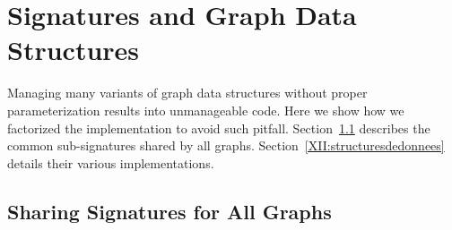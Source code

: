 
\section{Signatures and Graph Data Structures}\label{XII:implementation}

Managing many variants of graph data structures without proper
parameterization results into unmanageable code.
%
Here we show how we factorized the \ocamlgraph implementation to avoid
such pitfall.  Section~\ref{XII:interface} describes the common
sub-signatures shared by all graphs. Section~\ref{XII:structuresdedonnees}
details their various implementations.


\subsection{Sharing Signatures for All Graphs}\label{XII:interface}


